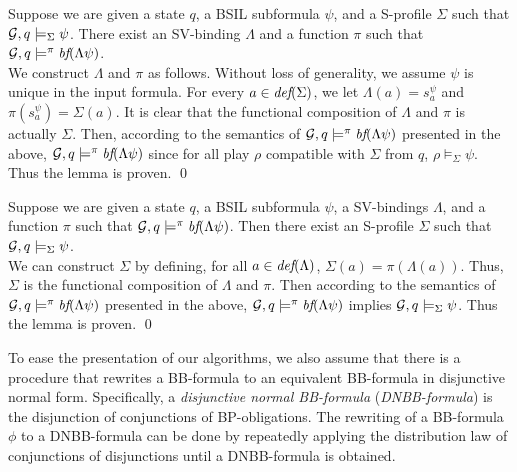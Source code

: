 {\lemma \label{lemma.bbf.fwd}
Suppose we are given a state $q$, 
a BSIL subformula $\psi$, and 
a S-profile $\Sigma$ such that ${\cal G},q\models_\Sigma\psi$.  
There exist an SV-binding $\Lambda$ and a function $\pi$ such that 
${\cal G},q\models^\pi\textit{bf}(\Lambda\psi)$.  
} 
\\\pf 
We construct $\Lambda$ and $\pi$ as follows. 
Without loss of generality, 
we assume $\psi$ is unique in the input formula. 
For every $a\in\textit{def}(\Sigma)$, 
we let $\Lambda(a)=s_a^\psi$ and $\pi(s_a^\psi)=\Sigma(a)$.  
It is clear that the functional composition of $\Lambda$ and $\pi$ is actually $\Sigma$.   
Then, according to the semantics of 
${\cal G},q\models^\pi\textit{bf}(\Lambda\psi)$ presented in the above, 
${\cal G},q\models^\pi\textit{bf}(\Lambda\psi)$ since 
for all play $\rho$ compatible with $\Sigma$ from $q$, 
$\rho\models_\Sigma\psi$.  
Thus the lemma is proven. 
\qed 

{\lemma \label{lemma.bbf.bkd}
Suppose we are given a state $q$,
a BSIL subformula $\psi$, 
a SV-bindings $\Lambda$, 
and a function $\pi$ such that  
${\cal G},q\models^\pi\textit{bf}(\Lambda\psi)$.  
Then there exist an S-profile $\Sigma$ 
such that ${\cal G},q\models_\Sigma\psi$. 
}
\\\pf 
We can construct $\Sigma$ by 
defining, for all $a\in \textit{def}(\Lambda)$, 
$\Sigma(a)=\pi(\Lambda(a))$.  
Thus, $\Sigma$ is the functional composition of $\Lambda$ and $\pi$.  
Then according to the semantics of  
${\cal G},q\models^\pi\textit{bf}(\Lambda\psi)$ presented in the above, 
${\cal G},q\models^\pi\textit{bf}(\Lambda\psi)$ implies ${\cal G},q\models_\Sigma \psi$.  
Thus the lemma is proven.  
\qed 



To ease the presentation of our algorithms,
we also assume that there is a procedure that 
rewrites a BB-formula to an equivalent BB-formula in disjunctive normal 
form.  
Specifically, a {\em disjunctive normal BB-formula} 
({\em DNBB-formula}) is the disjunction of conjunctions of 
BP-obligations. 
The rewriting of a BB-formula $\phi$ to a DNBB-formula can be 
done by repeatedly applying the distribution law of conjunctions 
of disjunctions until 
a DNBB-formula is obtained.

